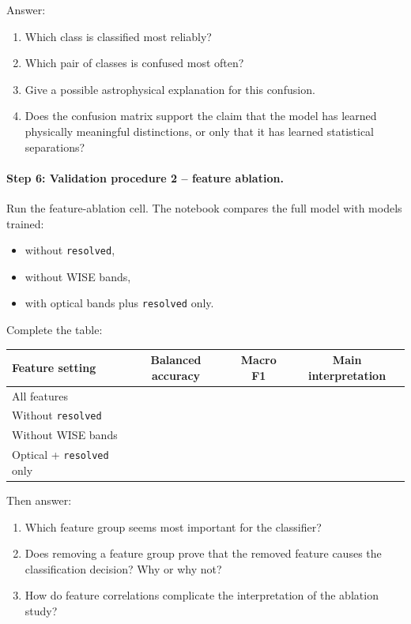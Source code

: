 Answer:
\begin{enumerate}
    \item Which class is classified most reliably?
    \item Which pair of classes is confused most often?
    \item Give a possible astrophysical explanation for this confusion.
    \item Does the confusion matrix support the claim that the model has learned physically meaningful distinctions, or only that it has learned statistical separations?
\end{enumerate}

\paragraph{Step 6: Validation procedure 2 -- feature ablation.}
Run the feature-ablation cell. The notebook compares the full model with models trained:
\begin{itemize}
    \item without \texttt{resolved},
    \item without WISE bands,
    \item with optical bands plus \texttt{resolved} only.
\end{itemize}

Complete the table:

\begin{center}
\begin{tabular}{l c c c}
\hline
Feature setting & Balanced accuracy & Macro F1 & Main interpretation \\
\hline
All features & & & \\
Without \texttt{resolved} & & & \\
Without WISE bands & & & \\
Optical + \texttt{resolved} only & & & \\
\hline
\end{tabular}
\end{center}

Then answer:
\begin{enumerate}
    \item Which feature group seems most important for the classifier?
    \item Does removing a feature group prove that the removed feature causes the classification decision? Why or why not?
    \item How do feature correlations complicate the interpretation of the ablation study?
\end{enumerate}

